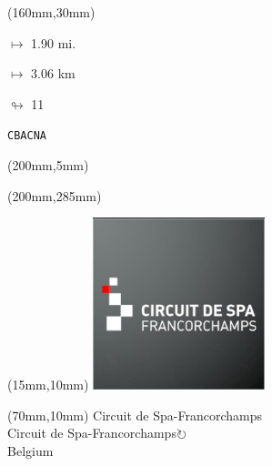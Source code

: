 \begin{textblock*}{40mm}(160mm,30mm)%
\Large
\par$\mapsto$ 1.90 mi.
\par$\mapsto$ 3.06 km
\par$\looparrowright$ 11
\par\hfill\tiny\tt CBACNA\\
\end{textblock*}
\begin{textblock*}{20mm}(200mm,5mm)%
\fbox{\thepage}
\label{CBACNA}
\end{textblock*}
\begin{textblock*}{20mm}(200mm,285mm)%
\fbox{\thepage}
\end{textblock*}

\null\newpage
\begin{textblock*}{50mm}(15mm,10mm)%
\includegraphics[width=50mm]{LG/2015-05-20_00079.png}
\end{textblock*}
\begin{textblock*}{130mm}(70mm,10mm)%
{\fontsize{20}{20}\selectfont Circuit de Spa-Francorchamps\\}
{\fontsize{16}{16}\selectfont Circuit de Spa-Francorchamps\hfill \Large$\circlearrowright$\\}
{\fontsize{12}{12}\selectfont Belgium\\}
\end{textblock*}
